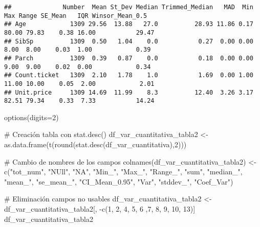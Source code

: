 \documentclass[
]{article}
\newenvironment{Shaded}{\begin{snugshade}}{\end{snugshade}}
\newcommand{\CommentTok}[1]{\textcolor[rgb]{0.50,0.62,0.50}{#1}}
\newcommand{\DataTypeTok}[1]{\textcolor[rgb]{0.87,0.87,0.75}{#1}}
\newcommand{\DecValTok}[1]{\textcolor[rgb]{0.86,0.86,0.80}{#1}}
\newcommand{\KeywordTok}[1]{\textcolor[rgb]{0.94,0.87,0.69}{#1}}
\newcommand{\NormalTok}[1]{\textcolor[rgb]{0.80,0.80,0.80}{#1}}
\newcommand{\OperatorTok}[1]{\textcolor[rgb]{0.94,0.94,0.82}{#1}}
\newcommand{\StringTok}[1]{\textcolor[rgb]{0.80,0.58,0.58}{#1}}
\begin{document}
\begin{verbatim}
##              Number  Mean St_Dev Median Trimmed_Median   MAD  Min   Max Range SE_Mean   IQR Winsor_Mean_0.5
## Age            1309 29.56  13.88   27.0          28.93 11.86 0.17 80.00 79.83    0.38 16.00           29.47
## SibSp          1309  0.50   1.04    0.0           0.27  0.00 0.00  8.00  8.00    0.03  1.00            0.39
## Parch          1309  0.39   0.87    0.0           0.18  0.00 0.00  9.00  9.00    0.02  0.00            0.34
## Count.ticket   1309  2.10   1.78    1.0           1.69  0.00 1.00 11.00 10.00    0.05  2.00            2.01
## Unit.price     1309 14.69  11.99    8.3          12.40  3.26 3.17 82.51 79.34    0.33  7.33           14.24
\end{verbatim}

\begin{Shaded}
\begin{Highlighting}[]
\KeywordTok{options}\NormalTok{(}\DataTypeTok{digits=}\DecValTok{2}\NormalTok{)}

\CommentTok{# Creación tabla con stat.desc()}
\NormalTok{df_var_cuantitativa_tabla2 <-}\StringTok{ }\KeywordTok{as.data.frame}\NormalTok{(}\KeywordTok{t}\NormalTok{(}\KeywordTok{round}\NormalTok{(}\KeywordTok{stat.desc}\NormalTok{(df_var_cuantitativa),}\DecValTok{2}\NormalTok{)))}

\CommentTok{# Cambio de nombres de los campos}
\KeywordTok{colnames}\NormalTok{(df_var_cuantitativa_tabla2) <-}\StringTok{ }\KeywordTok{c}\NormalTok{(}\StringTok{"tot_num"}\NormalTok{, }\StringTok{"NUll"}\NormalTok{, }\StringTok{"NA"}\NormalTok{, }\StringTok{"Min_"}\NormalTok{, }\StringTok{"Max_"}\NormalTok{, }\StringTok{"Range_"}\NormalTok{, }\StringTok{"sum"}\NormalTok{, }\StringTok{"median_"}\NormalTok{, }\StringTok{"mean_"}\NormalTok{, }\StringTok{"se_mean_"}\NormalTok{, }\StringTok{"CI_Mean_0.95"}\NormalTok{, }\StringTok{"Var"}\NormalTok{, }\StringTok{"stddev_"}\NormalTok{, }\StringTok{"Coef_Var"}\NormalTok{)}

\CommentTok{# Eliminación campos no usables}
\NormalTok{df_var_cuantitativa_tabla2 <-}\StringTok{ }\NormalTok{df_var_cuantitativa_tabla2[, }\OperatorTok{-}\KeywordTok{c}\NormalTok{(}\DecValTok{1}\NormalTok{, }\DecValTok{2}\NormalTok{, }\DecValTok{4}\NormalTok{, }\DecValTok{5}\NormalTok{, }\DecValTok{6}\NormalTok{ ,}\DecValTok{7}\NormalTok{, }\DecValTok{8}\NormalTok{, }\DecValTok{9}\NormalTok{, }\DecValTok{10}\NormalTok{, }\DecValTok{13}\NormalTok{)]}
\NormalTok{df_var_cuantitativa_tabla2}
\end{Highlighting}
\end{Shaded}
\end{document}
